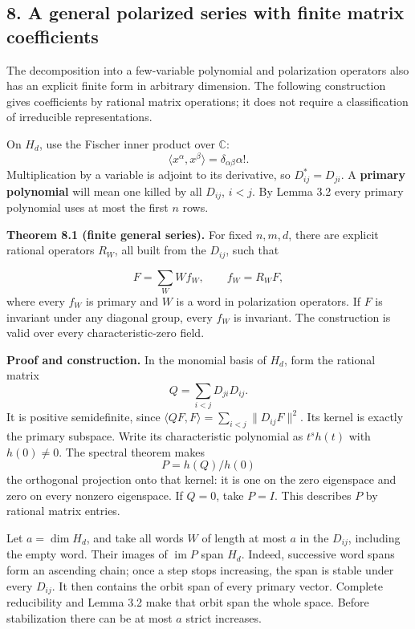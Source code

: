 \documentclass[
]{article}
\begin{document}
\subsection{8. A general polarized series with finite matrix
coefficients}\label{section-8}

The decomposition into a few-variable polynomial and polarization
operators also has an explicit finite form in arbitrary dimension. The
following construction gives coefficients by rational matrix operations;
it does not require a classification of irreducible representations.

On \(H_d\), use the Fischer inner product over \(\mathbb C\): \[
\langle x^\alpha,x^\beta\rangle=\delta_{\alpha\beta}\alpha!.
\] Multiplication by a variable is adjoint to its derivative, so
\(D_{ij}^*=D_{ji}\). A \textbf{primary polynomial} will mean one killed
by all \(D_{ij}\), \(i<j\). By Lemma 3.2 every primary polynomial uses
at most the first \(n\) rows.

\protect{}\label{theorem-8-1}{}

\textbf{Theorem 8.1 (finite general series).} For fixed \(n,m,d\), there
are explicit rational operators \(R_W\), all built from the \(D_{ij}\),
such that \protect{}\label{equation-P14}{}

\[
F=\sum_W Wf_W,\qquad f_W=R_WF,
\tag{P14}
\] where every \(f_W\) is primary and \(W\) is a word in polarization
operators. If \(F\) is invariant under any diagonal group, every \(f_W\)
is invariant. The construction is valid over every characteristic-zero
field.

\textbf{Proof and construction.} In the monomial basis of \(H_d\), form
the rational matrix \[
Q=\sum_{i<j}D_{ji}D_{ij}.
\] It is positive semidefinite, since
\(\langle QF,F\rangle=\sum_{i<j}\|D_{ij}F\|^2\). Its kernel is exactly
the primary subspace. Write its characteristic polynomial as
\(t^s h(t)\) with \(h(0)\ne0\). The spectral theorem makes \[
P=h(Q)/h(0)
\] the orthogonal projection onto that kernel: it is one on the zero
eigenspace and zero on every nonzero eigenspace. If \(Q=0\), take
\(P=I\). This describes \(P\) by rational matrix entries.

Let \(a=\dim H_d\), and take all words \(W\) of length at most \(a\) in
the \(D_{ij}\), including the empty word. Their images of
\(\operatorname{im}P\) span \(H_d\). Indeed, successive word spans form
an ascending chain; once a step stops increasing, the span is stable
under every \(D_{ij}\). It then contains the orbit span of every primary
vector. Complete reducibility and Lemma 3.2 make that orbit span the
whole space. Before stabilization there can be at most \(a\) strict
increases.
\end{document}
